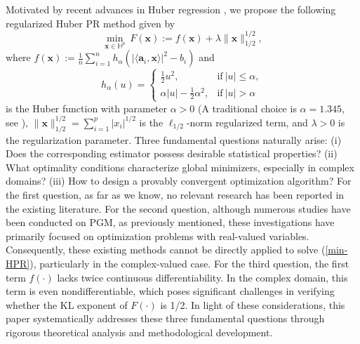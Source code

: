 \documentclass{article}
\numberwithin{equation}{section}
\begin{document}
Motivated by recent advances in Huber regression \cite{fan2017estimation,xie2023huber,tyralis2025deep}, we propose the following regularized Huber PR method given by
\begin{equation}\label{min-HPR}
	\mathop {\min }\limits_{\mathbf{x}\in\mathbb{H}^p}~F(\mathbf{x}):=f(\mathbf{x})+\lambda\|\mathbf{x}\|_{1/2}^{1/2},
\end{equation}
where $f(\mathbf{x}):=\frac{1}{n}\sum_{i=1}^nh_{\alpha}(|\langle \mathbf{a}_i,\mathbf{x}\rangle|^2-b_i)$ and
\begin{equation}\nonumber
	{h_{\alpha}(u)} =
	\begin{cases}
		\frac{1}{2}u^2,&{\mbox{if}~|u|\leq\alpha},\\
		{\alpha |u|-\frac{1}{2}\alpha^2,}&{\mbox{if}~|u|>\alpha}
	\end{cases}
\end{equation}
is the Huber function with parameter $\alpha>0$ (A traditional choice is $\alpha=1.345$, see \cite{huber2011robust}), $\|\mathbf{x}\|_{1/2}^{1/2}=\sum_{i=1}^p |x_i|^{1/2}$ is the $\ell_{1/2}$-norm regularized term, and $\lambda>0$ is the regularization parameter. Three fundamental questions naturally arise: 
	(i)  Does the corresponding estimator possess desirable statistical properties? (ii) What optimality conditions characterize global minimizers, especially in complex domains? (iii) How to design a provably convergent optimization algorithm? For the first question, as far as we know, no relevant research has been reported in the existing literature.
For the second question, although numerous studies have been conducted on PGM, as previously mentioned, these investigations have primarily focused on optimization problems with real-valued variables. Consequently, these existing methods cannot be directly applied to solve (\ref{min-HPR}), particularly in the complex-valued case. For the third question, the first term $f(\cdot)$ lacks twice continuous differentiability. In the complex domain, this term is even nondifferentiable, which poses significant challenges in verifying whether the KL exponent of $F(\cdot)$ is 1/2. In light of these considerations, this paper systematically addresses these three fundamental questions through rigorous theoretical analysis and methodological development. 
\end{document}
